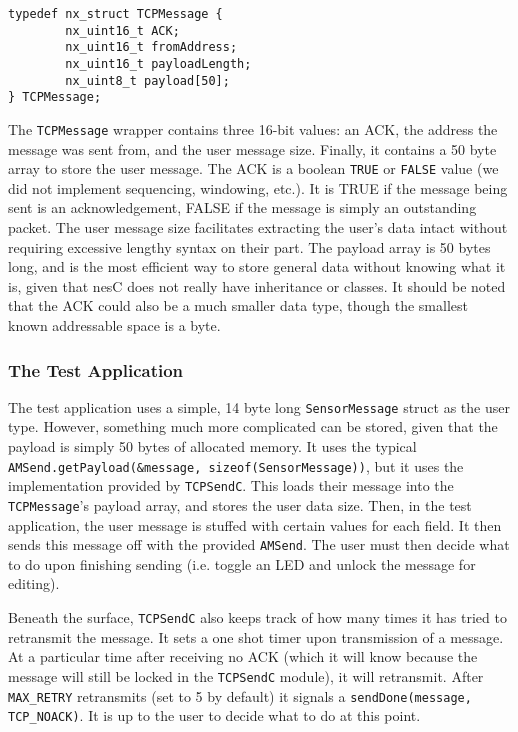 \documentclass{sig-alternate}
\begin{document}
\lstset{language=nesc,caption=TCPMessage.h,label=TCPMessage}
\begin{lstlisting}
typedef nx_struct TCPMessage {
        nx_uint16_t ACK;
        nx_uint16_t fromAddress;
        nx_uint16_t payloadLength;
        nx_uint8_t payload[50];
} TCPMessage;
\end{lstlisting}
The \texttt{TCPMessage} wrapper contains three 16-bit values: an ACK, the address the message was sent from, and the user message size.  Finally, it contains a 50 byte array to store the user message.  The ACK is a boolean \texttt{TRUE} or \texttt{FALSE} value (we did not implement sequencing, windowing, etc.). It is TRUE if the message being sent is an acknowledgement, FALSE if the message is simply an outstanding packet.  The user message size facilitates extracting the user's data intact without requiring excessive lengthy syntax on their part. The payload array is 50 bytes long, and is the most efficient way to store general data without knowing what it is, given that nesC does not really have inheritance or classes. It should be noted that the ACK could also be a much smaller data type, though the smallest known addressable space is a byte.

\subsubsection*{The Test Application}
The test application uses a simple, 14 byte long \texttt{SensorMessage} struct as the user type. However, something much more complicated can be stored, given that the payload is simply 50 bytes of allocated memory. It uses the typical \texttt{AMSend.getPayload(\&message, sizeof(SensorMessage))}, but it uses the implementation provided by \texttt{TCPSendC}. This loads their message into the \texttt{TCPMessage}'s payload array, and stores the user data size. Then, in the test application, the user message is stuffed with certain values for each field.  It then sends this message off with the provided \texttt{AMSend}. The user must then decide what to do upon finishing sending (i.e. toggle an LED and unlock the message for editing).


Beneath the surface, \texttt{TCPSendC} also keeps track of how many times it has tried to retransmit the message. It sets a one shot timer upon transmission of a message. At a particular time after receiving no ACK (which it will know because the message will still be locked in the \texttt{TCPSendC} module), it will retransmit. After \texttt{MAX\_RETRY} retransmits (set to 5 by default) it signals a \texttt{sendDone(message, TCP\_NOACK)}. It is up to the user to decide what to do at this point.
\end{document}
